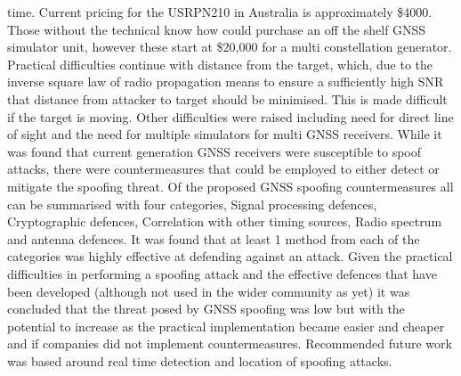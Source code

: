 time. Current pricing for the USRPN210 in Australia is approximately \$4000. 
Those without the technical know how could purchase an off the shelf GNSS simulator unit, however these start at \$20,000 for a multi constellation generator. Practical
difficulties continue with distance from the target, which, due to the inverse square law of radio propagation means to ensure a sufficiently high SNR that distance from
attacker to target should be minimised. This is made difficult if the target is moving. Other difficulties were raised including need for direct line of sight and the need for
multiple simulators for multi GNSS receivers. 
While it was found that current generation GNSS receivers were susceptible to spoof attacks, there were countermeasures that could be employed to either detect or
mitigate the spoofing threat. Of the proposed GNSS spoofing countermeasures all can be summarised with four categories, Signal processing defences, Cryptographic
defences, Correlation with other timing sources, Radio spectrum and antenna defences. It was found that at least 1 method from each of the categories was highly effective
at defending against an attack. Given the practical difficulties in performing a spoofing attack and the effective defences that have been developed (although not used in
the wider community as yet) it was concluded that the threat posed by GNSS spoofing was low but with the potential to increase as the practical implementation became
easier and cheaper and if companies did not implement countermeasures.
Recommended future work was based around real time detection and location of spoofing attacks.

\medskip

